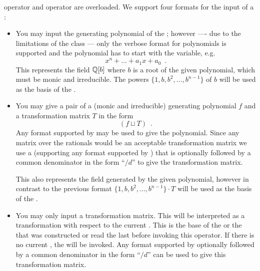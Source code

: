 
\IO \label{order_io}

 operator \code{>>} and  operator \code{<<} are overloaded.  We
support four formats for the input of a :
\begin{itemize}
\item You may input the generating polynomial of the ; however ---- due to
  the limitations of the class  --- only the verbose format for polynomials is
  supported and the polynomial has to start with the variable, e.g.
  \begin{displaymath}
    x^n + \dots + a_1 x + a_0 \enspace.
  \end{displaymath}
  This represents the field $\mathbb{Q}[b]$ where $b$ is a root of the given polynomial, which must
  be monic and irreducible.  The powers $\{1, b, b^2, \dots, b^{n-1}\}$ of $b$ will be used as
  the basis of the .
  
\item You may give a pair of a (monic and irreducible) generating polynomial $f$ and a
  transformation matrix $T$ in the form
  \begin{displaymath}
    (f \sqcup T) \enspace.
  \end{displaymath}
  Any format supported by  may be used to give the polynomial.  Since
  any matrix over the rationals would be an acceptable transformation matrix we use a
   (supporting any format supported by ) that is
  optionally followed by a common denominator in the form ``$/ d$'' to give the transformation
  matrix.
  
  This also represents the field generated by the given polynomial, however in contrast to the
  previous format $\{ 1, b, b^2, \dots, b^{n-1} \} \cdot T$ will be used as the basis of the
  .
  
\item You may only input a transformation matrix.  This will be interpreted as a transformation
  with respect to the current .  This is the base of the  or
  the  that was constructed or read the last before invoking this operator.  If
  there is no current , the \LEH will be invoked.  Any format supported by
   optionally followed by a common denominator in the form ``$/ d$'' can be
  used to give this transformation matrix.
  

\end{itemize}
